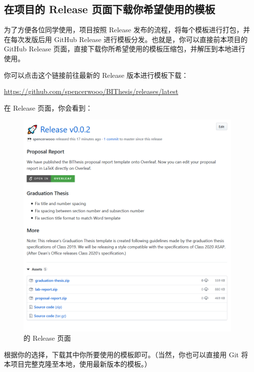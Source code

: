 \subsection{在项目的 Release 页面下载你希望使用的模板}
为了方便各位同学使用，项目按照 Release 发布的流程，将每个模板进行打包，并在每次发版后用 GitHub Release 进行模板分发。也就是，你可以直接前本项目的 GitHub Release 页面，直接下载你所希望使用的模板压缩包，并解压到本地进行使用。

你可以点击这个链接前往最新的 Release 版本进行模板下载：

\begin{center}
  \color{ForestGreen}\href{https://github.com/spencerwooo/BIThesis/releases/latest}{https://github.com/spencerwooo/BIThesis/releases/latest}
\end{center}

在 Release 页面，你会看到：


\begin{figure}[H]
  \centering
  \includegraphics[width=\textwidth]{images/release.png}
  \caption{{\BIThesis} 的 Release 页面}
\end{figure}

根据你的选择，下载其中你所要使用的模板即可。（当然，你也可以直接用 Git 将本项目完整克隆至本地，使用最新版本的模板。）
